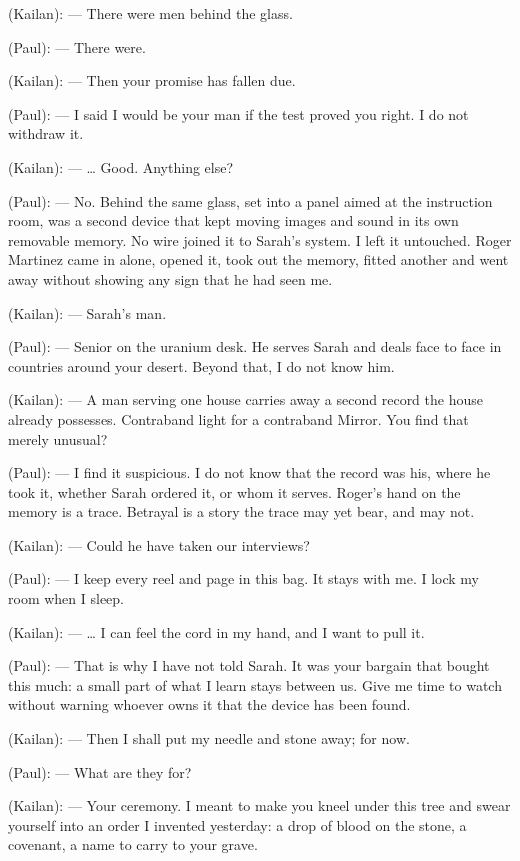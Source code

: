\begin{room}
(Kailan): --- There were men behind the glass.

(Paul): --- There were.

(Kailan): --- Then your promise has fallen due.

(Paul): --- I said I would be your man if the test proved you right. I do not withdraw it.

(Kailan): --- \ldots{} Good. Anything else?

(Paul): --- No. Behind the same glass, set into a panel aimed at the instruction room, was a second device that kept moving images and sound in its own removable memory. No wire joined it to Sarah's system. I left it untouched. Roger Martinez came in alone, opened it, took out the memory, fitted another and went away without showing any sign that he had seen me.

(Kailan): --- Sarah's man.

(Paul): --- Senior on the uranium desk. He serves Sarah and deals face to face in countries around your desert. Beyond that, I do not know him.

(Kailan): --- A man serving one house carries away a second record the house already possesses. Contraband light for a contraband Mirror. You find that merely unusual?

(Paul): --- I find it suspicious. I do not know that the record was his, where he took it, whether Sarah ordered it, or whom it serves. Roger's hand on the memory is a trace. Betrayal is a story the trace may yet bear, and may not.

(Kailan): --- Could he have taken our interviews?

(Paul): --- I keep every reel and page in this bag. It stays with me. I lock my room when I sleep.

(Kailan): --- \ldots{} I can feel the cord in my hand, and I want to pull it.

(Paul): --- That is why I have not told Sarah. It was your bargain that bought this much: a small part of what I learn stays between us. Give me time to watch without warning whoever owns it that the device has been found.

(Kailan): --- Then I shall put my needle and stone away; for now.

(Paul): --- What are they for?

(Kailan): --- Your ceremony. I meant to make you kneel under this tree and swear yourself into an order I invented yesterday: a drop of blood on the stone, a covenant, a name to carry to your grave.


\end{room}
